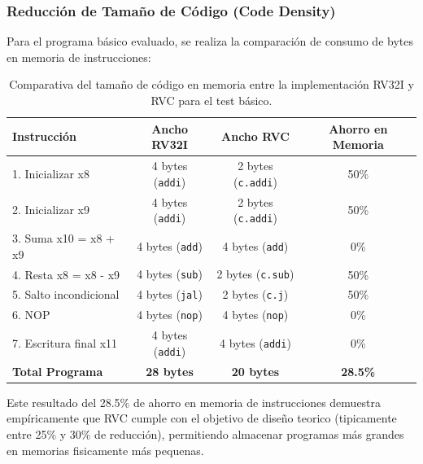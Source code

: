 \documentclass[12pt, a4paper]{article}
\begin{document}
\subsubsection{Reducción de Tamaño de Código (Code Density)}
Para el programa básico evaluado, se realiza la comparación de consumo de bytes en memoria de instrucciones:
\begin{table}[H]
\centering
\begin{tabular}{l|c|c|c}
\toprule
\textbf{Instrucción} & \textbf{Ancho RV32I} & \textbf{Ancho RVC} & \textbf{Ahorro en Memoria} \\
\midrule
1. Inicializar x8 & 4 bytes (\texttt{addi}) & 2 bytes (\texttt{c.addi}) & 50\% \\
2. Inicializar x9 & 4 bytes (\texttt{addi}) & 2 bytes (\texttt{c.addi}) & 50\% \\
3. Suma x10 = x8 + x9 & 4 bytes (\texttt{add}) & 4 bytes (\texttt{add}) & 0\% \\
4. Resta x8 = x8 - x9 & 4 bytes (\texttt{sub}) & 2 bytes (\texttt{c.sub}) & 50\% \\
5. Salto incondicional & 4 bytes (\texttt{jal}) & 2 bytes (\texttt{c.j}) & 50\% \\
6. NOP & 4 bytes (\texttt{nop}) & 4 bytes (\texttt{nop}) & 0\% \\
7. Escritura final x11 & 4 bytes (\texttt{addi}) & 4 bytes (\texttt{addi}) & 0\% \\
\midrule
\textbf{Total Programa} & \textbf{28 bytes} & \textbf{20 bytes} & \textbf{28.5\%} \\
\bottomrule
\end{tabular}
\caption{Comparativa del tamaño de código en memoria entre la implementación RV32I y RVC para el test básico.}
\label{tab:ahorro_memoria}
\end{table}

Este resultado del 28.5\% de ahorro en memoria de instrucciones demuestra empíricamente que RVC cumple con el objetivo de diseño teorico (tipicamente entre 25\% y 30\% de reducción), permitiendo almacenar programas más grandes en memorias fisicamente más pequenas.
\end{document}
